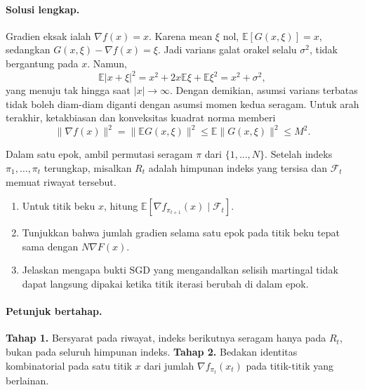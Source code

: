 \paragraph{Solusi lengkap.}
\label{orig03:ps04:solution:0003}
Gradien eksak ialah $\nabla f(x)=x$. Karena mean $\xi$ nol,
$\mathbb E[G(x,\xi)]=x$, sedangkan
$G(x,\xi)-\nabla f(x)=\xi$. Jadi varians galat orakel selalu
$\sigma^2$, tidak bergantung pada $x$. Namun,
\[
 \mathbb E|x+\xi|^2=x^2+2x\mathbb E\xi+\mathbb E\xi^2
 =x^2+\sigma^2,
\]
yang menuju tak hingga saat $|x|\to\infty$. Dengan demikian, asumsi varians
terbatas tidak boleh diam-diam diganti dengan asumsi momen kedua seragam.
Untuk arah terakhir, ketakbiasan dan konveksitas kuadrat norma memberi
\[
 \lVert\nabla f(x)\rVert^2
 =\lVert\mathbb E G(x,\xi)\rVert^2
 \le\mathbb E\lVert G(x,\xi)\rVert^2\le M^2.
\]

\begin{exercise}
\label{orig03:ps04:exercise:0004}
Dalam satu epok, ambil permutasi seragam $\pi$ dari
$\{1,\ldots,N\}$. Setelah indeks
$\pi_1,\ldots,\pi_t$ terungkap, misalkan $R_t$ adalah himpunan indeks yang
tersisa dan $\mathcal F_t$ memuat riwayat tersebut.

\begin{enumerate}
  \item Untuk titik beku $x$, hitung
  $\mathbb E[\nabla f_{\pi_{t+1}}(x)\mid\mathcal F_t]$.
  \item Tunjukkan bahwa jumlah gradien selama satu epok pada titik beku tepat
  sama dengan $N\nabla F(x)$.
  \item Jelaskan mengapa bukti SGD yang mengandalkan selisih martingal tidak
  dapat langsung dipakai ketika titik iterasi berubah di dalam epok.
\end{enumerate}
\end{exercise}

\paragraph{Petunjuk bertahap.}
\label{orig03:ps04:hint:0004}
\textbf{Tahap 1.} Bersyarat pada riwayat, indeks berikutnya seragam hanya pada
$R_t$, bukan pada seluruh himpunan indeks.
\textbf{Tahap 2.} Bedakan identitas kombinatorial pada satu titik $x$ dari
jumlah $\nabla f_{\pi_t}(x_t)$ pada titik-titik yang berlainan.

